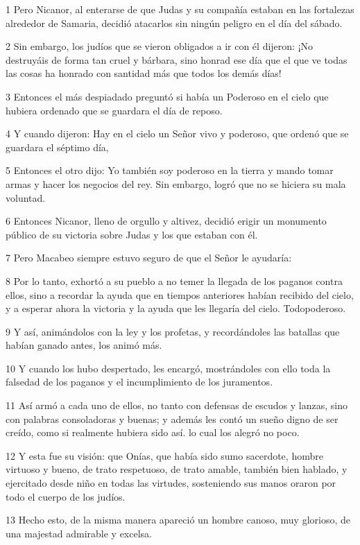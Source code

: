 \par 1 Pero Nicanor, al enterarse de que Judas y su compañía estaban en las fortalezas alrededor de Samaria, decidió atacarlos sin ningún peligro en el día del sábado.
\par 2 Sin embargo, los judíos que se vieron obligados a ir con él dijeron: ¡No destruyáis de forma tan cruel y bárbara, sino honrad ese día que el que ve todas las cosas ha honrado con santidad más que todos los demás días!
\par 3 Entonces el más despiadado preguntó si había un Poderoso en el cielo que hubiera ordenado que se guardara el día de reposo.
\par 4 Y cuando dijeron: Hay en el cielo un Señor vivo y poderoso, que ordenó que se guardara el séptimo día,
\par 5 Entonces el otro dijo: Yo también soy poderoso en la tierra y mando tomar armas y hacer los negocios del rey. Sin embargo, logró que no se hiciera su mala voluntad.
\par 6 Entonces Nicanor, lleno de orgullo y altivez, decidió erigir un monumento público de su victoria sobre Judas y los que estaban con él.
\par 7 Pero Macabeo siempre estuvo seguro de que el Señor le ayudaría:
\par 8 Por lo tanto, exhortó a su pueblo a no temer la llegada de los paganos contra ellos, sino a recordar la ayuda que en tiempos anteriores habían recibido del cielo, y a esperar ahora la victoria y la ayuda que les llegaría del cielo. Todopoderoso.
\par 9 Y así, animándolos con la ley y los profetas, y recordándoles las batallas que habían ganado antes, los animó más.
\par 10 Y cuando los hubo despertado, les encargó, mostrándoles con ello toda la falsedad de los paganos y el incumplimiento de los juramentos.
\par 11 Así armó a cada uno de ellos, no tanto con defensas de escudos y lanzas, sino con palabras consoladoras y buenas; y además les contó un sueño digno de ser creído, como si realmente hubiera sido así. lo cual los alegró no poco.
\par 12 Y esta fue su visión: que Onías, que había sido sumo sacerdote, hombre virtuoso y bueno, de trato respetuoso, de trato amable, también bien hablado, y ejercitado desde niño en todas las virtudes, sosteniendo sus manos oraron por todo el cuerpo de los judíos.
\par 13 Hecho esto, de la misma manera apareció un hombre canoso, muy glorioso, de una majestad admirable y excelsa.
